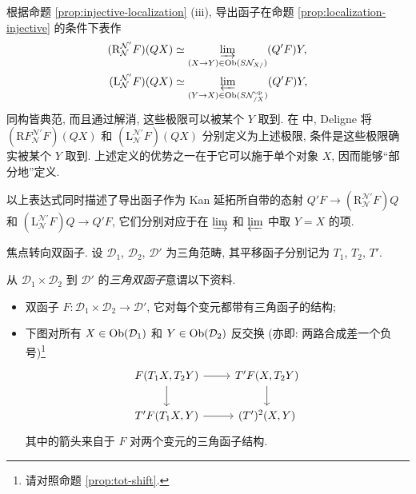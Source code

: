 \begin{remark}\label{rem:Deligne-derived-functor}
	根据命题 \ref{prop:injective-localization} (iii), 导出函子在命题 \ref{prop:localization-injective} 的条件下表作
	\begin{align*}
		(\mathrm{R}_{\mathcal{N}}^{\mathcal{N}'} F)(QX) & \simeq \varinjlim_{(X \to Y) \in \operatorname{Ob}(S\mathcal{N}_{X/})} (Q'F)Y, \\
		(\mathrm{L}_{\mathcal{N}}^{\mathcal{N}'} F)(QX) & \simeq \varprojlim_{(Y \to X) \in \operatorname{Ob}(S\mathcal{N}_{/X}^{\operatorname{op}})} (Q'F)Y,
	\end{align*}
	同构皆典范, 而且通过解消, 这些极限可以被某个 $Y$ 取到. 在 \cite[Exp XVII, Déf 1.2.1]{SGA4-3} 中, Deligne 将 $(\mathrm{R}F_{\mathcal{N}}^{\mathcal{N}'} F)(QX)$ 和 $(\mathrm{L}_{\mathcal{N}}^{\mathcal{N}'} F)(QX)$ 分别定义为上述极限, 条件是这些极限确实被某个 $Y$ 取到. 上述定义的优势之一在于它可以施于单个对象 $X$, 因而能够``部分地''定义.
	
	以上表达式同时描述了导出函子作为 Kan 延拓所自带的态射 $Q'F \to (\mathrm{R}^{\mathcal{N}'}_{\mathcal{N}} F)Q$ 和 $(\mathrm{L}^{\mathcal{N}'}_{\mathcal{N}} F)Q \to Q'F$, 它们分别对应于在 $\varinjlim$ 和 $\varprojlim$ 中取 $Y=X$ 的项.
\end{remark}

焦点转向双函子. 设 $\mathcal{D}_1$, $\mathcal{D}_2$, $\mathcal{D}'$ 为三角范畴, 其平移函子分别记为 $T_1$, $T_2$, $T'$.

\begin{definition}\label{def:triangulated-bifunctor}
	从 $\mathcal{D}_1 \times \mathcal{D}_2$ 到 $\mathcal{D}'$ 的\emph{三角双函子}意谓以下资料.
	\begin{itemize}
		\item 双函子 $F: \mathcal{D}_1 \times \mathcal{D}_2 \to \mathcal{D}'$, 它对每个变元都带有三角函子的结构;
		\item 下图对所有 $X \in \operatorname{Ob}(\mathcal{D}_1)$ 和 $Y \in \operatorname{Ob}(\mathcal{D}_2)$ 反交换 (亦即: 两路合成差一个负号)\footnote{请对照命题 \ref{prop:tot-shift}.}
		\[\begin{tikzcd}
			F(T_1 X, T_2 Y) \arrow[r] \arrow[d] & T' F(X, T_2 Y) \arrow[d] \\
			T' F(T_1 X, Y) \arrow[r] & (T')^2(X, Y)
		\end{tikzcd}\]
		其中的箭头来自于 $F$ 对两个变元的三角函子结构.
	\end{itemize}
\end{definition}

